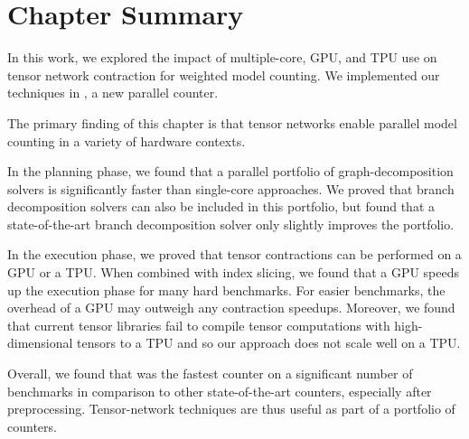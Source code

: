\section{Chapter Summary}
In this work, we explored the impact of multiple-core, GPU, and TPU use on tensor network contraction for weighted model counting. We implemented our techniques in , a new parallel counter.

{ \color{blue}
The primary finding of this chapter is that tensor networks enable parallel model counting in a variety of hardware contexts.

In the planning phase, we found that a parallel portfolio of graph-decomposition solvers is significantly faster than single-core approaches. We proved that branch decomposition solvers can also be included in this portfolio, but found that a state-of-the-art branch decomposition solver only slightly improves the portfolio. 

In the execution phase, we proved that tensor contractions can be performed on a GPU or a TPU. When combined with index slicing, we found that a GPU speeds up the execution phase for many hard benchmarks. For easier benchmarks, the overhead of a GPU may outweigh any contraction speedups. 
Moreover, we found that current tensor libraries fail to compile tensor computations with high-dimensional tensors to a TPU and so our approach does not scale well on a TPU.

Overall, we found that  was the fastest counter on a significant number of benchmarks in comparison to other state-of-the-art counters, especially after preprocessing. Tensor-network techniques are thus useful as part of a portfolio of counters.
}  %